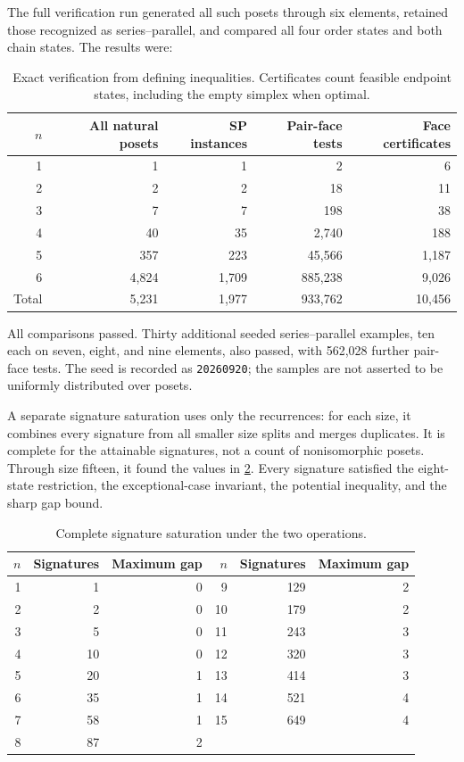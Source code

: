 \documentclass[11pt]{article}
\theoremstyle{definition}
\begin{document}
The full verification run generated all such posets through six elements, retained those recognized as series--parallel, and compared all four order states and both chain states. The results were:

\begin{table}[htbp]
\centering
\caption{Exact verification from defining inequalities. Certificates count feasible endpoint states, including the empty simplex when optimal.}\label{tab:geometry}
\begin{tabular}{rrrrr}
\toprule
$n$ & All natural posets & SP instances & Pair-face tests & Face certificates\\
\midrule
1 & 1 & 1 & 2 & 6\\
2 & 2 & 2 & 18 & 11\\
3 & 7 & 7 & 198 & 38\\
4 & 40 & 35 & 2,740 & 188\\
5 & 357 & 223 & 45,566 & 1,187\\
6 & 4,824 & 1,709 & 885,238 & 9,026\\
\midrule
Total & 5,231 & 1,977 & 933,762 & 10,456\\
\bottomrule
\end{tabular}
\end{table}

All comparisons passed. Thirty additional seeded series--parallel examples, ten each on seven, eight, and nine elements, also passed, with 562,028 further pair-face tests. The seed is recorded as \texttt{20260920}; the samples are not asserted to be uniformly distributed over posets.

A separate signature saturation uses only the recurrences: for each size, it combines every signature from all smaller size splits and merges duplicates. It is complete for the attainable signatures, not a count of nonisomorphic posets. Through size fifteen, it found the values in \cref{tab:signatures}. Every signature satisfied the eight-state restriction, the exceptional-case invariant, the potential inequality, and the sharp gap bound.

\begin{table}[htbp]
\centering
\caption{Complete signature saturation under the two operations.}\label{tab:signatures}
\begin{tabular}{rrr@{\qquad}rrr}
\toprule
$n$ & Signatures & Maximum gap & $n$ & Signatures & Maximum gap\\
\midrule
1 & 1 & 0 & 9 & 129 & 2\\
2 & 2 & 0 & 10 & 179 & 2\\
3 & 5 & 0 & 11 & 243 & 3\\
4 & 10 & 0 & 12 & 320 & 3\\
5 & 20 & 1 & 13 & 414 & 3\\
6 & 35 & 1 & 14 & 521 & 4\\
7 & 58 & 1 & 15 & 649 & 4\\
8 & 87 & 2 &  & & \\
\bottomrule
\end{tabular}
\end{table}
\end{document}
